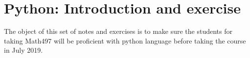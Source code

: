 \chapter{Python: Introduction and exercise}
The object of this set of notes and exercises is to make sure the students for taking Math497 will be proficient with python language before taking the course in July 2019.



